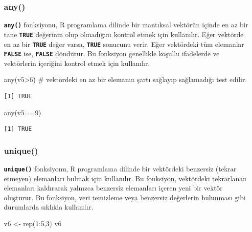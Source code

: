 \documentclass[
  letterpaper,
  DIV=11,
  numbers=noendperiod]{scrreprt}
\newenvironment{Shaded}{\begin{snugshade}}{\end{snugshade}}
\newcommand{\CommentTok}[1]{\textcolor[rgb]{0.37,0.37,0.37}{#1}}
\newcommand{\DecValTok}[1]{\textcolor[rgb]{0.68,0.00,0.00}{#1}}
\newcommand{\FunctionTok}[1]{\textcolor[rgb]{0.28,0.35,0.67}{#1}}
\newcommand{\NormalTok}[1]{\textcolor[rgb]{0.00,0.23,0.31}{#1}}
\newcommand{\OtherTok}[1]{\textcolor[rgb]{0.00,0.23,0.31}{#1}}
\newcommand{\SpecialCharTok}[1]{\textcolor[rgb]{0.37,0.37,0.37}{#1}}
\begin{document}
\hypertarget{any}{%
\subsubsection{any()}\label{any}}

\textbf{\texttt{any()}} fonksiyonu, R programlama dilinde bir mantıksal
vektörün içinde en az bir tane \textbf{\texttt{TRUE}} değerinin olup
olmadığını kontrol etmek için kullanılır. Eğer vektörde en az bir
\textbf{\texttt{TRUE}} değer varsa, \textbf{\texttt{TRUE}} sonucunu
verir. Eğer vektördeki tüm elemanlar \textbf{\texttt{FALSE}} ise,
\textbf{\texttt{FALSE}} döndürür. Bu fonksiyon genellikle koşullu
ifadelerde ve vektörlerin içeriğini kontrol etmek için kullanılır.

\begin{Shaded}
\begin{Highlighting}[]
\FunctionTok{any}\NormalTok{(v5}\SpecialCharTok{\textgreater{}}\DecValTok{6}\NormalTok{) }\CommentTok{\# vektördeki en az bir elemanın şartı sağlayıp sağlamadığı test edilir.}
\end{Highlighting}
\end{Shaded}

\begin{verbatim}
[1] TRUE
\end{verbatim}

\begin{Shaded}
\begin{Highlighting}[]
\FunctionTok{any}\NormalTok{(v5}\SpecialCharTok{==}\DecValTok{9}\NormalTok{) }
\end{Highlighting}
\end{Shaded}

\begin{verbatim}
[1] TRUE
\end{verbatim}

\hypertarget{unique}{%
\subsubsection{unique()}\label{unique}}

\textbf{\texttt{unique()}} fonksiyonu, R programlama dilinde bir
vektördeki benzersiz (tekrar etmeyen) elemanları bulmak için kullanılır.
Bu fonksiyon, vektördeki tekrarlanan elemanları kaldırarak yalnızca
benzersiz elemanları içeren yeni bir vektör oluşturur. Bu fonksiyon,
veri temizleme veya benzersiz değerlerin bulunması gibi durumlarda
sıklıkla kullanılır.

\begin{Shaded}
\begin{Highlighting}[]
\NormalTok{v6 }\OtherTok{\textless{}{-}} \FunctionTok{rep}\NormalTok{(}\DecValTok{1}\SpecialCharTok{:}\DecValTok{5}\NormalTok{,}\DecValTok{3}\NormalTok{)}
\NormalTok{v6}
\end{Highlighting}
\end{Shaded}
\end{document}
